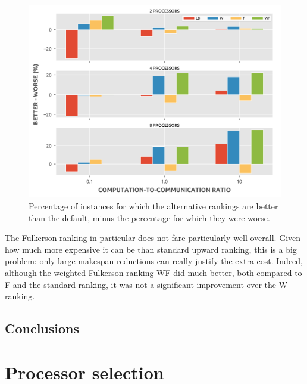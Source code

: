 \documentclass[12pt]{article}
\begin{document}
\begin{figure}
	\centering	
	\includegraphics[scale=0.8]{100tasks_differential.png}
	\caption{Percentage of instances for which the alternative rankings are better than the default, minus the percentage for which they were worse.}	
	\label{plot.rankings_diff_100}
\end{figure}


The Fulkerson ranking in particular does not fare particularly well overall. Given how much more expensive it can be than standard upward ranking, this is a big problem: only large makespan reductions can really justify the extra cost. Indeed, although the weighted Fulkerson ranking WF did much better, both compared to F and the standard ranking, it was not a significant improvement over the W ranking.  
    

%

\subsection{Conclusions}
\label{subsect.conclusions}


\section{Processor selection}
\label{sect.processor_selection}




\end{document}
